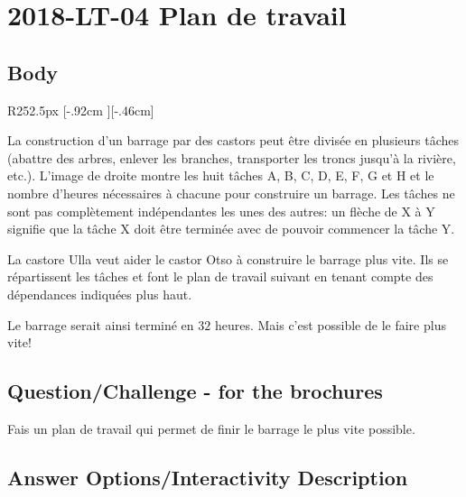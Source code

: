 \documentclass[a4paper,11pt]{report}
\newcommand{\taskGraphicsFolder}{..}
\begin{document}
\section*{\centering{} 2018-LT-04 Plan de travail}


\subsection*{Body}

\begin{wrapfigure}{R}{252.5px}
\raisebox{-.46cm}[\dimexpr \height-.92cm \relax][-.46cm]{}
\end{wrapfigure}
La construction d’un barrage par des castors peut être divisée en plusieurs tâches (abattre des arbres, enlever les branches, transporter les troncs jusqu’à la rivière, etc.). L’image de droite montre les huit tâches A, B, C, D, E, F, G et H et le nombre d’heures nécessaires à chacune pour construire un barrage. Les tâches ne sont pas complètement indépendantes les unes des autres: un flèche de X à Y signifie que la tâche X doit être terminée avec de pouvoir commencer la tâche Y.

La castore Ulla veut aider le castor Otso à construire le barrage plus vite. Ils se répartissent les tâches et font le plan de travail suivant en tenant compte des dépendances indiquées plus haut.

{\centering%
\par}

Le barrage serait ainsi terminé en $32$ heures. Mais c’est possible de le faire plus vite!

{\em


\subsection*{Question/Challenge - for the brochures}

Fais un plan de travail qui permet de finir le barrage le plus vite possible.

}

\begingroup
\renewcommand{\arraystretch}{1.5}
\subsection*{Answer Options/Interactivity Description}

{\centering%
\par}
\end{document}
